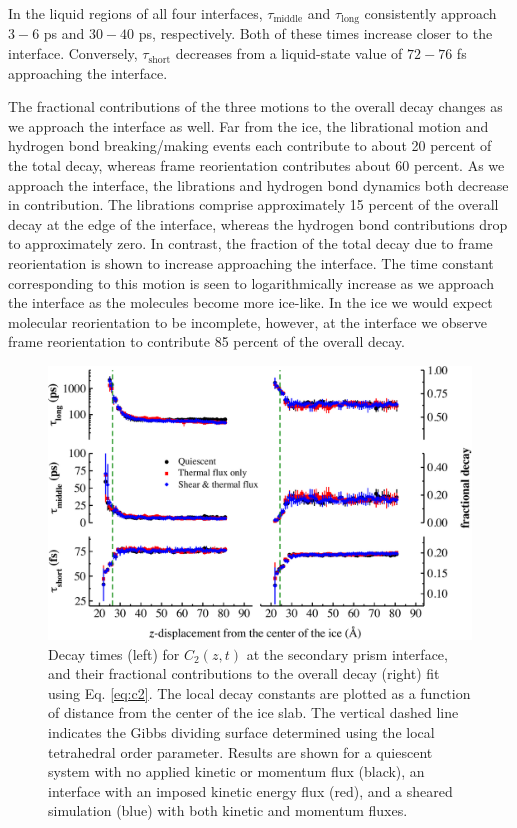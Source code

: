 In the liquid regions of all four interfaces, $\tau_\mathrm{middle}$
and $\tau_\mathrm{long}$ consistently approach $3-6$ ps and $30-40$
ps, respectively.  Both of these times increase closer to the
interface.  Conversely, $\tau_\mathrm{short}$ decreases from a
liquid-state value of $72-76$ fs approaching the interface.

The fractional contributions of the three motions to the overall decay
changes as we approach the interface as well. Far from the ice, the
librational motion and hydrogen bond breaking/making events each
contribute to about 20 percent of the total decay, whereas frame
reorientation contributes about 60 percent. As we approach the
interface, the librations and hydrogen bond dynamics both decrease in
contribution. The librations comprise approximately 15 percent of the
overall decay at the edge of the interface, whereas the hydrogen bond
contributions drop to approximately zero. In contrast, the fraction of
the total decay due to frame reorientation is shown to increase
approaching the interface.  The time constant corresponding to this
motion is seen to logarithmically increase as we approach the interface
as the molecules become more ice-like. In the ice we would expect
molecular reorientation to be incomplete, however, at the interface we
observe frame reorientation to contribute 85 percent of the overall
decay.

\newpage
\begin{figure}
\includegraphics[width=\linewidth]{Figures/Sec_lcorrz}
\caption{\label{fig:SPorient} Decay times (left) for $C_2(z,t)$ at the
  secondary prism interface, and their fractional contributions to the
  overall decay (right) fit using Eq. \eqref{eq:c2}. The local decay
  constants are plotted as a function of distance from the center of
  the ice slab. The vertical dashed line indicates the Gibbs dividing
  surface determined using the local tetrahedral order parameter.
  Results are shown for a quiescent system with no applied kinetic or
  momentum flux (black), an interface with an imposed
  kinetic energy flux (red), and a sheared simulation (blue) with both
  kinetic and momentum fluxes.}
\end{figure}

